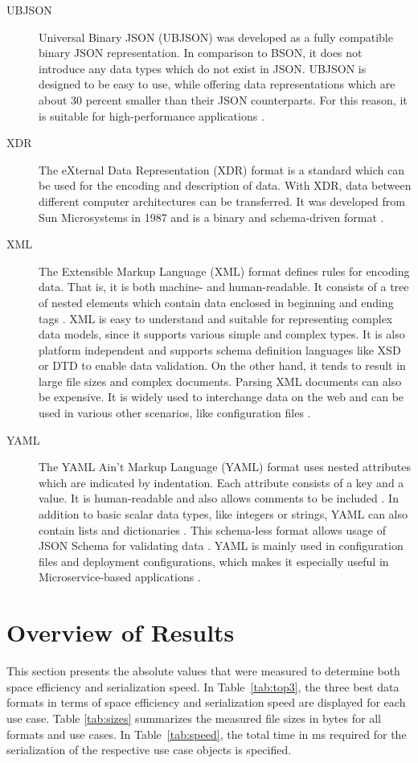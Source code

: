 \documentclass[10pt]{IEEEtran}
\begin{document}
\begin{description}
    \item[UBJSON]  Universal Binary JSON (UBJSON) was developed as a fully compatible binary JSON representation. In comparison to BSON, it does not introduce any data types which do not exist in JSON. UBJSON is designed to be easy to use, while offering data representations which are about 30 percent smaller than their JSON counterparts. For this reason, it is suitable for high-performance applications \cite{ubjson_2024}.
    \item[XDR] The eXternal Data Representation (XDR) format is a standard which can be used for the encoding and description of data. With XDR, data between different computer architectures can be transferred. It was developed from Sun Microsystems in 1987 and is a binary and schema-driven format \cite{sun_microsystems_1987}. 
    \item[XML] The Extensible Markup Language (XML) format defines rules for encoding data. That is, it is both machine- and human-readable. It consists of a tree of nested elements which contain data enclosed in beginning and ending tags \cite{kaur_2020}. XML is easy to understand and suitable for representing complex data models, since it supports various simple and complex types. It is also platform independent and supports schema definition languages like XSD or DTD to enable data validation. On the other hand, it tends to result in large file sizes and complex documents. Parsing XML documents can also be expensive. It is widely used to interchange data on the web and can be used in various other scenarios, like configuration files \cite{klimenko_2024}.
    \item[YAML] The YAML Ain't Markup Language (YAML) format uses nested attributes which are indicated by indentation. Each attribute consists of a key and a value. It is human-readable and also allows comments to be included \cite{kaur_2020}. In addition to basic scalar data types, like integers or strings, YAML can also contain lists and dictionaries \cite{javatpoint_2025}. This schema-less format allows usage of JSON Schema for validating data \cite{jsonschema_2018}. YAML is mainly used in configuration files and deployment configurations, which makes it especially useful in Microservice-based applications \cite{buildpiper_2023}. 
\end{description}

\newpage

\section{Overview of Results}
This section presents the absolute values that were measured to determine both space efficiency and serialization speed. In Table~\ref{tab:top3}, the three best data formats in terms of space efficiency and serialization speed are displayed for each use case. Table \ref{tab:sizes} summarizes the measured file sizes in bytes for all formats and use cases. In Table~\ref{tab:speed}, the total time in ms required for the serialization of the respective use case objects is specified.
\end{document}

